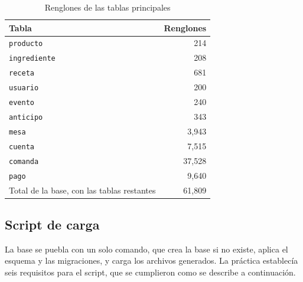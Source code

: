 \begin{table}[H]
    \centering
    \small
    \begin{tabular}{lr}
        \toprule
        \textbf{Tabla} & \textbf{Renglones} \\
        \midrule
        \texttt{producto} & 214 \\
        \texttt{ingrediente} & 208 \\
        \texttt{receta} & 681 \\
        \texttt{usuario} & 200 \\
        \texttt{evento} & 240 \\
        \texttt{anticipo} & 343 \\
        \texttt{mesa} & 3,943 \\
        \texttt{cuenta} & 7,515 \\
        \texttt{comanda} & 37,528 \\
        \texttt{pago} & 9,640 \\
        \midrule
        Total de la base, con las tablas restantes & 61,809 \\
        \bottomrule
    \end{tabular}
    \captionsetup{labelfont=bf, textfont=it, labelsep=newline, justification=raggedright, singlelinecheck=false}
    \caption{Renglones de las tablas principales}
    \label{tab:volumen}
\end{table}

\subsection{Script de carga}

La base se puebla con un solo comando, que crea la base si no existe, aplica el esquema y las migraciones, y carga los archivos generados. La práctica establecía seis requisitos para el script, que se cumplieron como se describe a continuación.


